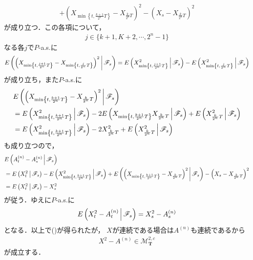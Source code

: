 \begin{sketch}
\begin{description}
\begin{align}
					+ \left(X_{\min\left\{t,\frac{k+1}{2^n}T\right\}} - X_{\frac{k}{2^n}T}\right)^2
					- \left(X_s - X_{\frac{k}{2^n}T}\right)^2
				\end{align}
				が成り立つ．この各項について，
				\begin{align}
					j \in \{k+1,K+2,\cdots,2^n-1\}
				\end{align}
				なる各$j$で$P$-a.s.に
				\begin{align}
					E\left(  \left(X_{\min\left\{t,\frac{j+1}{2^n}T\right\}} - X_{\min\left\{t,\frac{j}{2^n}T\right\}}\right)^2 \, \middle|\, \mathscr{F}_s \right)
					= E\left( X^2_{\min\left\{t,\frac{j+1}{2^n}T\right\}} \, \middle|\, \mathscr{F}_s \right)
					 - E\left( X^2_{\min\left\{t,\frac{j}{2^n}T\right\}} \, \middle|\, \mathscr{F}_s \right)
				\end{align}
				が成り立ち，また$P$-a.s.に
				\begin{align}
					&E\left( \left(X_{\min\left\{t,\frac{k+1}{2^n}T\right\}} - X_{\frac{k}{2^n}T}\right)^2 \, \middle|\, \mathscr{F}_s \right) \\
					&= E\left( X_{\min\left\{t,\frac{k+1}{2^n}T\right\}}^2 \, \middle|\, \mathscr{F}_s \right)
					- 2 E\left( X_{\min\left\{t,\frac{k+1}{2^n}T\right\}}X_{\frac{k}{2^n}T} \, \middle|\, \mathscr{F}_s \right)
					+ E\left( X_{\frac{k}{2^n}T}^2 \, \middle|\, \mathscr{F}_s \right) \\
					&= E\left( X_{\min\left\{t,\frac{k+1}{2^n}T\right\}}^2 \, \middle|\, \mathscr{F}_s \right)
					- 2 X_{\frac{k}{2^n}T}^2
					+ E\left( X_{\frac{k}{2^n}T}^2 \, \middle|\, \mathscr{F}_s \right) \\
				\end{align}
				も成り立つので，
				\begin{align}
					&E\left( A^{(n)}_t - A^{(n)}_s \, \middle|\, \mathscr{F}_s \right) \\
					&= E\left( X^2_t \, \middle|\, \mathscr{F}_s \right)
					- E\left( X^2_{\min\left\{t,\frac{k+1}{2^n}T\right\}} \, \middle|\, \mathscr{F}_s \right)
					+ E\left( \left(X_{\min\left\{t,\frac{k+1}{2^n}T\right\}} - X_{\frac{k}{2^n}T}\right)^2 \, \middle|\, \mathscr{F}_s \right)
					- \left(X_s - X_{\frac{k}{2^n}T}\right)^2 \\
					&= E\left( X^2_t \, \middle|\, \mathscr{F}_s \right) - X_s^2
				\end{align}
				が従う．ゆえに$P$-a.s.に
				\begin{align}
					E\left( X^2_t - A^{(n)}_t \, \middle|\, \mathscr{F}_s \right) = X^2_s - A^{(n)}_s
				\end{align}
				となる．以上で()が得られたが，
				$X$が連続である場合は$A^{(n)}$も連続であるから
				\begin{align}
					X^2 - A^{(n)} \in \mathscr{M}^{2,c}_{\mathbf{T}}
					\label{fom:thm_decomposition_of_local_martingales_3}
				\end{align}
				が成立する．
				

\end{description}
\end{sketch}
